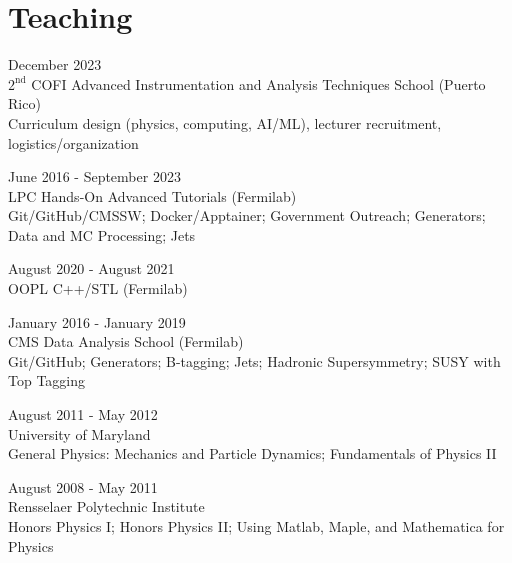 \section{Teaching}
\begin{description}[leftmargin=12pt,font=\normalfont\textit]
\item[Co-director] \hfill December 2023\\
$2^{\text{nd}}$ COFI Advanced Instrumentation and Analysis Techniques School (Puerto Rico)\\
Curriculum design (physics, computing, AI/ML), lecturer recruitment, logistics/organization
\item[Facilitator] \hfill June 2016 - September 2023\\
LPC Hands-On Advanced Tutorials (Fermilab)\\
Git/GitHub/CMSSW; Docker/Apptainer; Government Outreach; Generators; Data and MC Processing; Jets
\item[Teaching Assistant] \hfill August 2020 - August 2021\\
OOPL C++/STL (Fermilab)
\item[Facilitator] \hfill January 2016 - January 2019\\
CMS Data Analysis School (Fermilab)\\
Git/GitHub; Generators; B-tagging; Jets; Hadronic Supersymmetry; SUSY with Top Tagging
\item[Graduate Teaching Assistant] \hfill August 2011 - May 2012\\
University of Maryland\\
General Physics: Mechanics and Particle Dynamics; Fundamentals of Physics II
\item[Undergraduate Teaching Assistant] \hfill August 2008 - May 2011\\
Rensselaer Polytechnic Institute\\
Honors Physics I; Honors Physics II; Using Matlab, Maple, and Mathematica for Physics
\end{description}